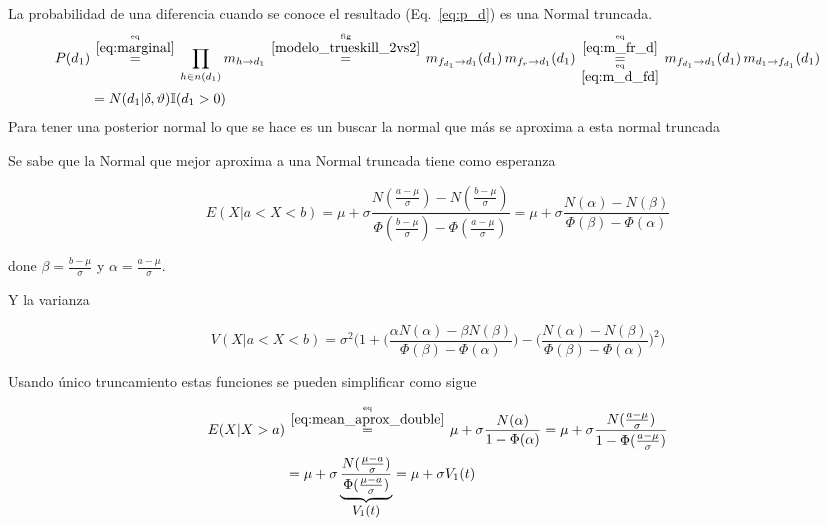 \documentclass[article]{jss}
\newcommand\hfrac[2]{\genfrac{}{}{0pt}{}{#1}{#2}} %
\begin{document}
\begin{appendix}
La probabilidad de una diferencia cuando se conoce el resultado (Eq.~\ref{eq:p_d}) es una Normal truncada.
%
\begin{equation}\label{eq:p_d}
\begin{split}
 P(d_1) & \overset{\hfrac{\text{eq}}{\ref{eq:marginal}}}{=}   \prod_{h \in n(d_1)} m_{h \rightarrow d_1} \overset{\hfrac{\text{fig}}{\ref{modelo_trueskill_2vs2}}}{=} m_{f_{d_1} \rightarrow d_1}(d_1) \, m_{f_r \rightarrow d_1}(d_1) \overset{\hfrac{\text{eq}}{\ref{eq:m_fr_d}}}{\underset{\hfrac{\text{eq}}{\ref{eq:m_d_fd}}}{=}}  m_{f_{d_1} \rightarrow d_1}(d_1) \, m_{d_1 \rightarrow f_{d_1}}(d_1)  \\
 & = N(d_1|\delta,\vartheta) \mathbb{I}(d_1 > 0)
\end{split}
\end{equation}
%
Para tener una posterior normal lo que se hace es un buscar la normal que m\'as se aproxima a esta normal truncada

\vspace{0.3cm}

Se sabe que la Normal que mejor aproxima a una Normal truncada tiene como esperanza

\begin{equation}\label{eq:mean_aprox_double}
 E(X| a < X < b) = \mu + \sigma \frac{N(\frac{a-\mu}{\sigma}) - N(\frac{b-\mu}{\sigma}) }{\Phi(\frac{b-\mu}{\sigma}) - \Phi(\frac{a-\mu}{\sigma}) } = \mu + \sigma \frac{N(\alpha) - N(\beta) }{\Phi(\beta) - \Phi(\alpha) }
\end{equation}

done $\beta = \frac{b-\mu}{\sigma}$ y $\alpha = \frac{a-\mu}{\sigma}$.

Y la varianza

\begin{equation}\label{eq:variance_aprox_double}
 V(X| a < X < b) = \sigma^2 \Bigg( 1 + \bigg(\frac{\alpha N(\alpha) - \beta N(\beta) }{\Phi(\beta) - \Phi(\alpha) }\bigg) - \bigg(\frac{N(\alpha) - N(\beta) }{\Phi(\beta) - \Phi(\alpha) }\bigg)^2 \Bigg)
\end{equation}

Usando  \'unico truncamiento estas funciones se pueden simplificar como sigue

\begin{equation}\label{eq:mean_aprox_}
\begin{split}
 E(X|  X > a)  & \overset{\hfrac{\text{eq}}{\ref{eq:mean_aprox_double}}}{=}  \mu + \sigma \frac{N(\alpha)}{1 - \Phi(\alpha) } = \mu + \sigma \frac{N(\frac{a-\mu}{\sigma})}{1 - \Phi(\frac{a-\mu}{\sigma}) }\\
 & = \mu + \sigma \underbrace{\frac{N(\frac{\mu-a}{\sigma})}{\Phi(\frac{\mu-a}{\sigma}) }}_{\text{\small $V_1(t)$} } = \mu + \sigma V_1(t)
 \end{split}
\end{equation}


\end{appendix}
\end{document}
